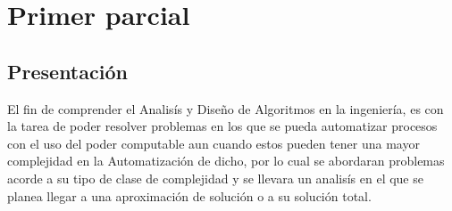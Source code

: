 \documentclass[10pt,executivepaper]{article}
\begin{document}
\begin{center}
	\par{}
	\par{}
	\par{}
	\par\vspace{2cm}{
		Ultima fecha modificado: \today
	}
\end{center}

\clearpage
\tableofcontents
\clearpage

\section{Primer parcial}
\subsection{Presentación}
El fin de comprender el Analisís y Diseño de Algoritmos en la ingeniería, es con la tarea de poder resolver problemas en los que se pueda automatizar procesos con el uso del poder computable aun cuando estos pueden tener una mayor complejidad en la Automatización de dicho, por lo cual se abordaran problemas acorde a su tipo de clase de complejidad y se llevara un analisís en el que se planea llegar a una aproximación de solución o a su solución total.
\end{document}
